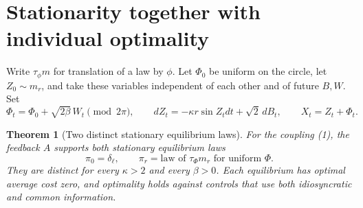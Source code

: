 \documentclass[11pt,a4paper]{article}
\newtheorem{theorem}{Theorem}[section]
\theoremstyle{remark}
\begin{document}
\section{Stationarity together with individual optimality}
Write $\tau_\phi m$ for translation of a law by $\phi$. Let $\Phi_0$ be uniform on the circle, let $Z_0\sim m_r$, and take these variables independent of each other and of future $B,W$. Set
\[
 \Phi_t=\Phi_0+\sqrt{2\beta}\,W_t\pmod{2\pi},
 \qquad dZ_t=-\kappa r\sin Z_tdt+\sqrt2\,dB_t,
 \qquad X_t=Z_t+\Phi_t.
\]
\begin{theorem}[Two distinct stationary equilibrium laws]
For the coupling (1), the feedback $A$ supports both stationary equilibrium laws
\[
 \pi_0=\delta_\ell,\qquad
 \pi_r=\text{law of }\tau_\Phi m_r\text{ for uniform }\Phi.
\]
They are distinct for every $\kappa>2$ and every $\beta>0$. Each equilibrium has optimal average cost zero, and optimality holds against controls that use both idiosyncratic and common information.
\end{theorem}
\end{document}
